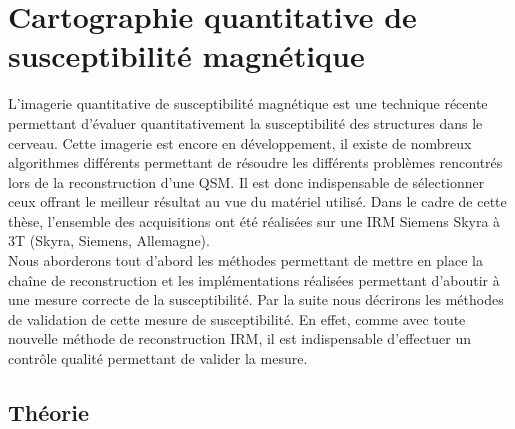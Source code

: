 
\chapter{Cartographie quantitative de susceptibilité magnétique}
\label{chap:qsm}
	\minitoc



L’imagerie quantitative de susceptibilité magnétique est une technique récente permettant
d’évaluer quantitativement la susceptibilité des structures dans le cerveau. Cette imagerie est encore
en développement, il existe de nombreux algorithmes différents permettant de résoudre les différents
problèmes rencontrés lors de la reconstruction d’une QSM. Il est donc indispensable de sélectionner
ceux offrant le meilleur résultat au vue du matériel utilisé. Dans le cadre de cette thèse, l’ensemble
des acquisitions ont été réalisées sur une IRM Siemens Skyra à 3T (Skyra, Siemens, Allemagne).\\
Nous aborderons tout d’abord les méthodes permettant de mettre en place la chaîne de
reconstruction et les implémentations réalisées permettant d’aboutir à une mesure correcte de la
susceptibilité. Par la suite nous décrirons les méthodes de validation de cette mesure de susceptibilité.
En effet, comme avec toute nouvelle méthode de reconstruction IRM, il est indispensable d’effectuer
un contrôle qualité permettant de valider la mesure.
\section{Théorie}
